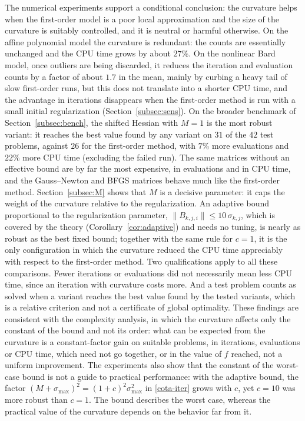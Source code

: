 \documentclass[11pt]{article}
\begin{document}
The numerical experiments support a conditional conclusion: the curvature
helps when the first-order model is a poor local approximation and the size of
the curvature is suitably controlled, and it is neutral or harmful otherwise.
On the affine polynomial model the curvature is redundant: the counts are
essentially unchanged and the CPU time grows by about $27\%$.
On the nonlinear Bard model, once outliers are being discarded, it reduces the
iteration and evaluation counts by a factor of about $1.7$ in the mean, mainly
by curbing a heavy tail of slow first-order runs, but this does not translate
into a shorter CPU time, and the advantage in iterations disappears when the
first-order method is run with a small initial regularization
(Section~\ref{subsec:sens}). On the broader benchmark of
Section~\ref{subsec:bench}, the shifted Hessian with $M=1$ is the most robust
variant: it reaches the best value found by any variant on $31$ of the $42$
test problems, against $26$ for the first-order method, with $7\%$ more
evaluations and $22\%$ more CPU time (excluding the failed run). The same
matrices without an effective bound are by far the most expensive, in
evaluations and in CPU time, and the Gauss--Newton and BFGS matrices behave
much like the first-order method. Section~\ref{subsec:M} shows that $M$ is a
decisive parameter: it caps the weight of the curvature relative to the
regularization. An adaptive bound proportional to the regularization
parameter, $\|B_{k,j,i}\| \le 10\,\sigma_{k,j}$, which is covered by the theory
(Corollary~\ref{cor:adaptive}) and needs no tuning, is nearly as robust as the best fixed bound; together
with the same rule for $c = 1$, it is the only configuration in which the
curvature reduced the CPU time appreciably with respect to the first-order
method. Two qualifications apply to all these comparisons. Fewer iterations
or evaluations did not necessarily mean less CPU time, since an iteration with
curvature costs more. And a test problem counts as solved when a variant
reaches the best value found by the tested variants, which is a relative
criterion and not a certificate of global optimality. These findings are
consistent with the complexity analysis, in which the curvature affects only
the constant of the bound and not its order: what can be expected from the
curvature is a constant-factor gain on suitable problems, in iterations,
evaluations or CPU time, which need not go together, or in the value of $f$
reached, not a uniform improvement. The experiments also show that the constant of the
worst-case bound is not a guide to practical performance: with the adaptive
bound, the factor $(M + \sigma_{\max})^2 = (1 + c)^2\sigma_{\max}^2$ in
\eqref{cota-iter} grows with $c$, yet $c = 10$ was more robust than $c = 1$.
The bound describes the worst case, whereas the practical value of the
curvature depends on the behavior far from it.
\end{document}
